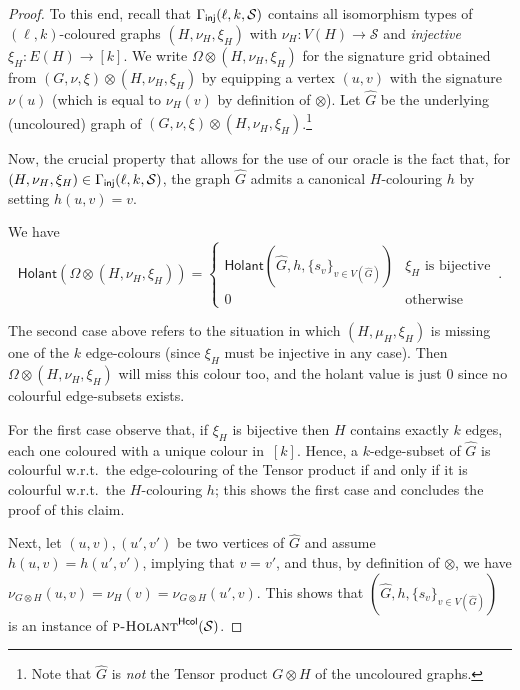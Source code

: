 \documentclass[authorcolumns,numberwithinsect]{no-lipics-v2022}
\newcommand{\holantprobstar}{\text{\sc{p-Holant}}^{\mathsf{Hcol}}}
\newcommand{\holant}{\mathsf{Holant}}
\begin{document}
\begin{proof}
     To this end, recall that $\Gamma_{\text{\sf{inj}}}(\ell,k,\mathcal{S})$ contains all isomorphism types of $(\ell,k)$-coloured graphs $(H,\nu_H,\xi_H)$ with $\nu_H: V(H) \to \mathcal{S}$ and \emph{injective} $\xi_H:E(H)\to [k]$. 
     We write $\Omega\otimes (H,\nu_H,\xi_H)$ for the signature grid obtained from $(G,\nu,\xi)\otimes (H,\nu_H,\xi_H)$ by equipping a vertex $(u,v)$ with the signature $\nu(u)$ (which is equal to $\nu_H(v)$ by definition of $\otimes$). Let $\hat{G}$ be the underlying (uncoloured) graph of $(G,\nu,\xi)\otimes (H,\nu_H,\xi_H)$.\footnote{Note that $\hat{G}$ is \emph{not} the Tensor product $G\otimes H$ of the uncoloured graphs.}

     Now, the crucial property that allows for the use of our oracle is the fact that, for $(H,\nu_H,\xi_H) \in \Gamma_{\text{\sf{inj}}}(\ell,k,\mathcal{S})$, the graph $\hat{G}$ admits a canonical $H$-colouring $h$ by setting $h(u,v)=v$. 
     \begin{claim}\label{claim:help_in_equivalence}
     We have
    \[\holant(\Omega\otimes (H,\nu_H,\xi_H))= \begin{cases}\holant(\hat{G},h,\{s_v\}_{v\in V(\hat{G})}) & \xi_H \text{ is bijective}\\
     0 & \text{otherwise}
     \end{cases}\,.\]
     \end{claim}
     \begin{claimproof}
     The second case above refers to the situation in which $(H,\mu_H,\xi_H)$ is missing one of the $k$ edge-colours (since $\xi_H$ must be injective in any case). Then $\Omega\otimes (H,\nu_H,\xi_H)$ will miss this colour too, and the holant value is just $0$ since no colourful edge-subsets exists. 
    
     For the first case observe that, if $\xi_H$ is bijective then $H$ contains exactly $k$ edges, each one coloured with a unique colour in~$[k]$. Hence, a $k$-edge-subset of $\hat{G}$ is colourful w.r.t.\ the edge-colouring of the Tensor product if and only if it is colourful w.r.t.\ the $H$-colouring $h$; this shows the first case and concludes the proof of this claim.
     \end{claimproof}
     
     Next, let $(u,v),(u',v')$ be two vertices of $\hat{G}$ and assume $h(u,v)=h(u',v')$, implying that $v=v'$, and thus, by definition of $\otimes$, we have $\nu_{G\otimes H}(u,v)=\nu_H(v)=\nu_{G\otimes H}(u',v)$. This shows that $(\hat{G},h,\{s_v\}_{v\in V(\hat{G})})$ is an instance of $\holantprobstar(\mathcal{S})$. 
     

\end{proof}
\end{document}
